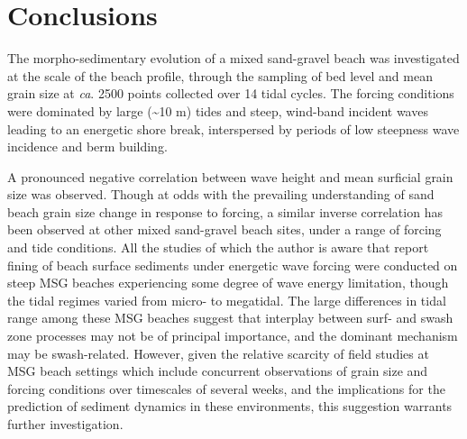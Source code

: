 %
%
%




\section{Conclusions}

The morpho-sedimentary evolution of a mixed sand-gravel beach was investigated at the scale of the beach profile, through the sampling of bed level and mean grain size at \textit{ca}. 2500 points collected over 14 tidal cycles. The forcing conditions were dominated by large (\textasciitilde 10 m) tides and steep, wind-band incident waves leading to an energetic shore break, interspersed by periods of low steepness wave incidence and berm building. 

A pronounced negative correlation between wave height and mean surficial grain size was observed. Though at odds with the prevailing understanding of sand beach grain size change in response to forcing, a similar inverse correlation has been observed at other mixed sand-gravel beach sites, under a range of forcing and tide conditions. All the studies of which the author is aware that report fining of beach surface sediments under energetic wave forcing were conducted on steep MSG beaches experiencing some degree of wave energy limitation, though the tidal regimes varied from micro- to megatidal. The large differences in tidal range among these MSG beaches suggest that interplay between surf- and swash zone processes may not be of principal importance, and the dominant mechanism may be swash-related. However, given the relative scarcity of field studies at MSG beach settings which include concurrent observations of grain size and forcing conditions over timescales of several weeks, and the implications for the prediction of sediment dynamics in these environments, this suggestion warrants further investigation. 

